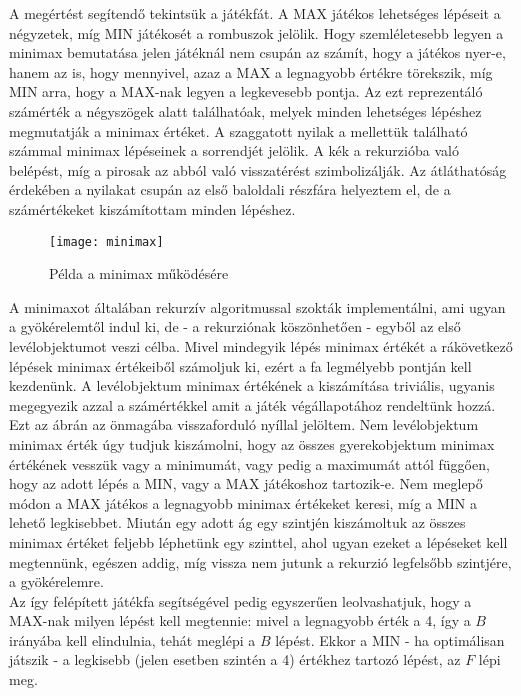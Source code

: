 A megértést segítendő tekintsük a  játékfát. A MAX játékos lehetséges lépéseit a négyzetek, míg MIN játékosét a rombuszok jelölik. Hogy szemléletesebb legyen a minimax bemutatása jelen játéknál nem csupán az számít, hogy a játékos nyer-e, hanem az is, hogy mennyivel, azaz a MAX a legnagyobb értékre törekszik, míg MIN arra, hogy a MAX-nak legyen a legkevesebb pontja. Az ezt reprezentáló számérték a négyszögek alatt találhatóak, melyek minden lehetséges lépéshez megmutatják a minimax értéket. A szaggatott nyilak a mellettük található számmal minimax lépéseinek a sorrendjét jelölik. A kék a rekurzióba való belépést, míg a pirosak az abból való visszatérést szimbolizálják. Az átláthatóság érdekében a nyilakat csupán az első baloldali részfára helyeztem el, de a számértékeket kiszámítottam minden lépéshez. \\

\begin{figure}[h]
	\texttt{[image: minimax]}
	\centering
	\caption{Példa a minimax működésére}
	\label{fig:minimax}
\end{figure}

A minimaxot általában rekurzív algoritmussal szokták implementálni, ami ugyan a gyökérelemtől indul ki, de - a rekurziónak köszönhetően - egyből az első levélobjektumot veszi célba. Mivel mindegyik lépés minimax értékét a rákövetkező lépések minimax értékeiből számoljuk ki, ezért a fa legmélyebb pontján kell kezdenünk. A levélobjektum minimax értékének a kiszámítása triviális, ugyanis megegyezik azzal a számértékkel amit a játék végállapotához rendeltünk hozzá. Ezt az ábrán az önmagába visszaforduló nyíllal jelöltem. Nem levélobjektum minimax érték úgy tudjuk kiszámolni, hogy az összes gyerekobjektum minimax értékének vesszük vagy a minimumát, vagy pedig a maximumát attól függően, hogy az adott lépés a MIN, vagy a MAX játékoshoz tartozik-e. Nem meglepő módon a MAX játékos a legnagyobb minimax értékeket keresi, míg a MIN a lehető legkisebbet. Miután egy adott ág egy szintjén kiszámoltuk az összes minimax értéket feljebb léphetünk egy szinttel, ahol ugyan ezeket a lépéseket kell megtennünk, egészen addig, míg vissza nem jutunk a rekurzió legfelsőbb szintjére, a gyökérelemre.\\

Az így felépített játékfa segítségével pedig egyszerűen leolvashatjuk, hogy a MAX-nak milyen lépést kell megtennie: mivel a legnagyobb érték a 4, így a $B$ irányába kell elindulnia, tehát meglépi a $B$ lépést. Ekkor a MIN - ha optimálisan játszik - a legkisebb (jelen esetben szintén a 4) értékhez tartozó lépést, az $F$ lépi meg.\\

